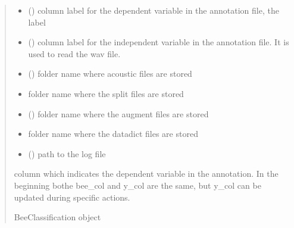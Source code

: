 \documentclass[letterpaper,10pt,english]{sphinxmanual}
\begin{document}
\begin{fulllineitems}
\begin{quote}
\begin{description}
\begin{itemize}
\item {} 
\sphinxAtStartPar
{} () \textendash{} column label for the dependent variable in the annotation file, the label

\item {} 
\sphinxAtStartPar
{} () \textendash{} column label for the independent variable in the annotation file. It is used to read the wav file.

\item {} 
\sphinxAtStartPar
{} () \textendash{} folder name where acoustic files are stored

\item {} 
\sphinxAtStartPar
{} \textendash{} folder name where the split files are stored

\item {} 
\sphinxAtStartPar
{} () \textendash{} folder name where the augment files are stored

\item {} 
\sphinxAtStartPar
{} \textendash{} folder name where the datadict files are stored

\item {} 
\sphinxAtStartPar
{} () \textendash{} path to the log file

\end{itemize}

\sphinxAtStartPar
column which indicates the dependent variable in the annotation. In the beginning bothe bee\_col and y\_col are the same, but y\_col can be updated during specific actions.

\sphinxAtStartPar
BeeClassification object

\sphinxAtStartPar
{\hyperref[\detokenize{BeeClassification:BeeClassification.BeeClassification}]{}}

\end{description}\end{quote}


\end{fulllineitems}
\end{document}
